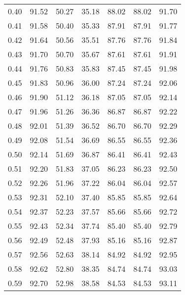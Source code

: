 \begin{tabular}{|c|c|c|c|c|c|c|}
      0.40 &     91.52 &     50.27 &      35.18 &   88.02 &      88.02 &         91.70 \\
      0.41 &     91.58 &     50.40 &      35.33 &   87.91 &      87.91 &         91.77 \\
      0.42 &     91.64 &     50.56 &      35.51 &   87.76 &      87.76 &         91.84 \\
      0.43 &     91.70 &     50.70 &      35.67 &   87.61 &      87.61 &         91.91 \\
      0.44 &     91.76 &     50.83 &      35.83 &   87.45 &      87.45 &         91.98 \\
      0.45 &     91.83 &     50.96 &      36.00 &   87.24 &      87.24 &         92.06 \\
      0.46 &     91.90 &     51.12 &      36.18 &   87.05 &      87.05 &         92.14 \\
      0.47 &     91.96 &     51.26 &      36.36 &   86.87 &      86.87 &         92.22 \\
      0.48 &     92.01 &     51.39 &      36.52 &   86.70 &      86.70 &         92.29 \\
      0.49 &     92.08 &     51.54 &      36.69 &   86.55 &      86.55 &         92.36 \\
      0.50 &     92.14 &     51.69 &      36.87 &   86.41 &      86.41 &         92.43 \\
      0.51 &     92.20 &     51.83 &      37.05 &   86.23 &      86.23 &         92.50 \\
      0.52 &     92.26 &     51.96 &      37.22 &   86.04 &      86.04 &         92.57 \\
      0.53 &     92.31 &     52.10 &      37.40 &   85.85 &      85.85 &         92.64 \\
      0.54 &     92.37 &     52.23 &      37.57 &   85.66 &      85.66 &         92.72 \\
      0.55 &     92.43 &     52.34 &      37.74 &   85.40 &      85.40 &         92.79 \\
      0.56 &     92.49 &     52.48 &      37.93 &   85.16 &      85.16 &         92.87 \\
      0.57 &     92.56 &     52.63 &      38.14 &   84.92 &      84.92 &         92.95 \\
      0.58 &     92.62 &     52.80 &      38.35 &   84.74 &      84.74 &         93.03 \\
      0.59 &     92.70 &     52.98 &      38.58 &   84.53 &      84.53 &         93.11 \\

\end{tabular}
